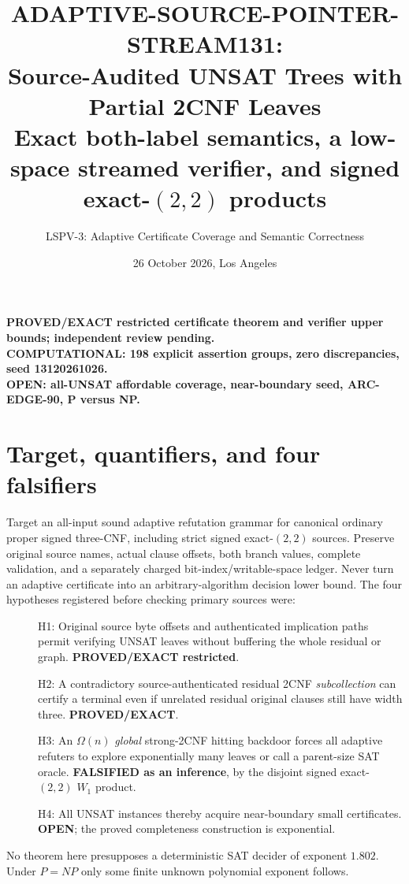 \documentclass[11pt]{article}
\title{ADAPTIVE-SOURCE-POINTER-STREAM131:\\Source-Audited UNSAT Trees with Partial 2CNF Leaves\\\large Exact both-label semantics, a low-space streamed verifier, and signed exact-$(2,2)$ products}
\author{LSPV-3: Adaptive Certificate Coverage and Semantic Correctness}
\date{26 October 2026, Los Angeles}
\begin{document}
\maketitle
\begin{center}
\textbf{PROVED/EXACT restricted certificate theorem and verifier upper bounds; independent review pending.}\\
\textbf{COMPUTATIONAL: 198 explicit assertion groups, zero discrepancies, seed 13120261026.}\\
\textbf{OPEN: all-UNSAT affordable coverage, near-boundary seed, ARC-EDGE-90, P versus NP.}
\end{center}

\section{Target, quantifiers, and four falsifiers}
Target an all-input sound adaptive refutation grammar for canonical ordinary proper signed three-CNF, including strict signed exact-$(2,2)$ sources. Preserve original source names, actual clause offsets, both branch values, complete validation, and a separately charged bit-index/writable-space ledger. Never turn an adaptive certificate into an arbitrary-algorithm decision lower bound. The four hypotheses registered before checking primary sources were:
\begin{description}
\item[] H1: Original source byte offsets and authenticated implication paths permit verifying UNSAT leaves without buffering the whole residual or graph. \textbf{PROVED/EXACT restricted}.
\item[] H2: A contradictory source-authenticated residual 2CNF \emph{subcollection} can certify a terminal even if unrelated residual original clauses still have width three. \textbf{PROVED/EXACT}.
\item[] H3: An $\Omega(n)$ \emph{global} strong-2CNF hitting backdoor forces all adaptive refuters to explore exponentially many leaves or call a parent-size SAT oracle. \textbf{FALSIFIED as an inference}, by the disjoint signed exact-$(2,2)$ $W_1$ product.
\item[] H4: All UNSAT instances thereby acquire near-boundary small certificates. \textbf{OPEN}; the proved completeness construction is exponential.
\end{description}
No theorem here presupposes a deterministic SAT decider of exponent $1.802$. Under $P=NP$ only some finite unknown polynomial exponent follows.
\end{document}
